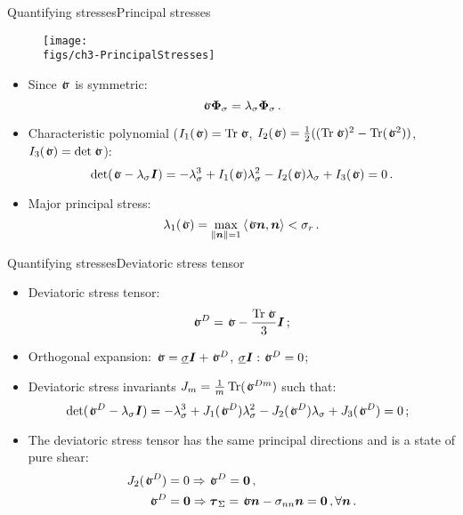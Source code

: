 \begin{frame}{Quantifying stresses}{Principal stresses}

\begin{figure}
\centering\texttt{[image: \\figs/ch3-PrincipalStresses]}
\end{figure}
\begin{itemize}
\item Since $\stress$ is symmetric:
\begin{displaymath}
\stress{\boldsymbol\Phi}_\stressj=\lambda_\stressj{\boldsymbol\Phi}_\stressj\,.
\end{displaymath}
\item Characteristic polynomial ($I_1(\stress)=\trace\stress$, $I_2(\stress)=\demi((\trace\stress)^2-\trace(\stress^2))$, $I_3(\stress)=\det\stress$):
\begin{displaymath}
\det(\stress-\lambda_\stressj\Id)=-\lambda_\stressj^3+I_1(\stress)\lambda_\stressj^2-I_2(\stress)\lambda_\stressj+I_3(\stress)=0\,.
\end{displaymath}
\item Major principal stress:
\begin{displaymath}
\lambda_1(\stress)=\max_{\norm{\nv}=1}\scal{\stress\nv,\nv}<\stressj_r\,.
\end{displaymath}
\end{itemize}

\end{frame}

\begin{frame}{Quantifying stresses}{Deviatoric stress tensor}

\begin{itemize}
\item Deviatoric stress tensor:
\begin{displaymath}
\stress^D=\stress-\frac{\trace\stress}{3}\Id\,;
\end{displaymath}
\item Orthogonal expansion: $\stress=\underline{\stressj}\Id+\stress^D$, $\underline{\stressj}\Id:\stress^D=0$;
\item Deviatoric stress invariants $J_m=\frac{1}{m}\trace(\stress^{Dm})$ such that:
\begin{displaymath}
\!\!\!\!\det(\stress^D-\lambda_\stressj\Id)=-\lambda_\stressj^3+J_1(\stress^D)\lambda_\stressj^2-J_2(\stress^D)\lambda_\stressj+J_3(\stress^D)=0\,;
\end{displaymath}
\item The deviatoric stress tensor has the same principal directions and is a state of pure shear:
\begin{displaymath}
\begin{split}
J_2(\stress^D) &=0\imply\stress^D=\bzero\,, \\
\stress^D &=\bzero\imply\tress_\Sigma=\stress\nv-\stressj_{\nj\nj}\nv=\bzero\,,\forall\nv\,.
\end{split}
\end{displaymath}
\end{itemize}

\end{frame}

